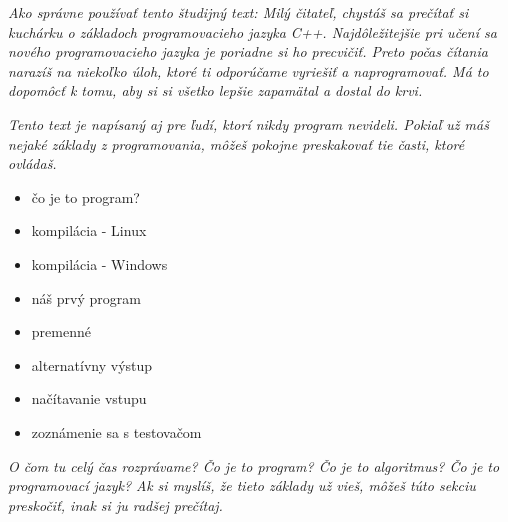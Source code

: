 




\textit{Ako správne používať tento študijný text: Milý čitateľ, chystáš sa
prečítať si kuchárku o základoch programovacieho jazyka C++. Najdôležitejšie
pri učení sa nového programovacieho jazyka je poriadne si ho precvičiť. Preto
počas čítania narazíš na niekoľko úloh, ktoré ti odporúčame vyriešiť a
naprogramovať.  Má to dopomôcť k tomu, aby si si všetko lepšie zapamätal a dostal
do krvi.}

\textit{Tento text je napísaný aj pre ľudí, ktorí nikdy program nevideli. Pokiaľ
už máš nejaké základy z programovania, môžeš pokojne preskakovať tie časti,
ktoré ovládaš.}

\begin{itemize}
    \vspace{-8pt}
    \item čo je to program?
    \vspace{-5pt}
    \item kompilácia - Linux
    \vspace{-5pt}
    \item kompilácia - Windows %
    \vspace{-5pt}
    \item náš prvý program
    \vspace{-5pt}
    \item premenné
    \vspace{-5pt}
    \item alternatívny výstup
    \vspace{-5pt}
    \item načítavanie vstupu
    \vspace{-5pt}
    \item zoznámenie sa s testovačom
\end{itemize}

\medskip

 \textit{O čom tu celý čas rozprávame? Čo je to program? Čo
je to algoritmus? Čo je to programovací jazyk?  Ak si myslíš, že tieto základy
už vieš, môžeš túto sekciu preskočiť, inak si ju radšej prečítaj.}

